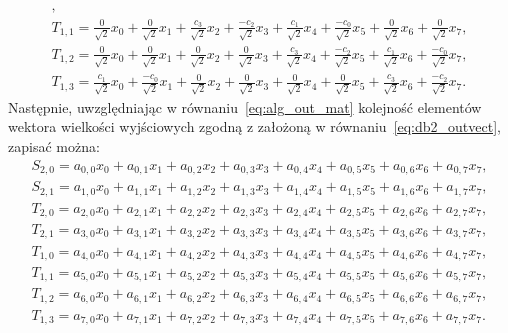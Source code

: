 \begin{gather}
\label{eq:db2_outvect_t_1_0_full}, \\
T_{1,1} =
	\frac{0}{\sqrt{2}} x_{0} + \frac{0}{\sqrt{2}} x_{1} + \frac{c_{3}}{\sqrt{2}} x_{2} + \frac{- c_{2}}{\sqrt{2}} x_{3} +
	\frac{c_{1}}{\sqrt{2}} x_{4} + \frac{- c_{0}}{\sqrt{2}} x_{5} + \frac{0}{\sqrt{2}} x_{6} + \frac{0}{\sqrt{2}} x_{7}
\label{eq:db2_outvect_t_1_1_full}, \\
T_{1,2} =
	\frac{0}{\sqrt{2}} x_{0} + \frac{0}{\sqrt{2}} x_{1} + \frac{0}{\sqrt{2}} x_{2} + \frac{0}{\sqrt{2}} x_{3} +
	\frac{c_{3}}{\sqrt{2}} x_{4} + \frac{- c_{2}}{\sqrt{2}} x_{5} + \frac{c_{1}}{\sqrt{2}} x_{6} + \frac{- c_{0}}{\sqrt{2}} x_{7}
\label{eq:db2_outvect_t_1_2_full}, \\
T_{1,3} =
	\frac{c_{1}}{\sqrt{2}} x_{0} + \frac{- c_{0}}{\sqrt{2}} x_{1} + \frac{0}{\sqrt{2}} x_{2} + \frac{0}{\sqrt{2}} x_{3} +
	\frac{0}{\sqrt{2}} x_{4} + \frac{0}{\sqrt{2}} x_{5} + \frac{c_{3}}{\sqrt{2}} x_{6} + \frac{- c_{2}}{\sqrt{2}} x_{7}
\label{eq:db2_outvect_t_1_3_full}.
\end{gather}
Następnie, uwzględniając w równaniu~\eqref{eq:alg_out_mat} kolejność elementów wektora wielkości wyjściowych zgodną z założoną w równaniu~\eqref{eq:db2_outvect}, zapisać można:
\begin{gather}
S_{2,0} = a_{0,0} x_{0} + a_{0,1} x_{1} + a_{0,2} x_{2} + a_{0,3} x_{3} + a_{0,4} x_{4} + a_{0,5} x_{5} + a_{0,6} x_{6} + a_{0,7} x_{7} \label{eq:db2_outvect_s_2_0_row}, \\
S_{2,1} = a_{1,0} x_{0} + a_{1,1} x_{1} + a_{1,2} x_{2} + a_{1,3} x_{3} + a_{1,4} x_{4} + a_{1,5} x_{5} + a_{1,6} x_{6} + a_{1,7} x_{7} \label{eq:db2_outvect_s_2_1_row}, \\
T_{2,0} = a_{2,0} x_{0} + a_{2,1} x_{1} + a_{2,2} x_{2} + a_{2,3} x_{3} + a_{2,4} x_{4} + a_{2,5} x_{5} + a_{2,6} x_{6} + a_{2,7} x_{7} \label{eq:db2_outvect_t_2_0_row}, \\
T_{2,1} = a_{3,0} x_{0} + a_{3,1} x_{1} + a_{3,2} x_{2} + a_{3,3} x_{3} + a_{3,4} x_{4} + a_{3,5} x_{5} + a_{3,6} x_{6} + a_{3,7} x_{7} \label{eq:db2_outvect_t_2_1_row}, \\
T_{1,0} = a_{4,0} x_{0} + a_{4,1} x_{1} + a_{4,2} x_{2} + a_{4,3} x_{3} + a_{4,4} x_{4} + a_{4,5} x_{5} + a_{4,6} x_{6} + a_{4,7} x_{7} \label{eq:db2_outvect_t_1_0_row}, \\
T_{1,1} = a_{5,0} x_{0} + a_{5,1} x_{1} + a_{5,2} x_{2} + a_{5,3} x_{3} + a_{5,4} x_{4} + a_{5,5} x_{5} + a_{5,6} x_{6} + a_{5,7} x_{7} \label{eq:db2_outvect_t_1_1_row}, \\
T_{1,2} = a_{6,0} x_{0} + a_{6,1} x_{1} + a_{6,2} x_{2} + a_{6,3} x_{3} + a_{6,4} x_{4} + a_{6,5} x_{5} + a_{6,6} x_{6} + a_{6,7} x_{7} \label{eq:db2_outvect_t_1_2_row}, \\
T_{1,3} = a_{7,0} x_{0} + a_{7,1} x_{1} + a_{7,2} x_{2} + a_{7,3} x_{3} + a_{7,4} x_{4} + a_{7,5} x_{5} + a_{7,6} x_{6} + a_{7,7} x_{7} \label{eq:db2_outvect_t_1_3_row}.
\end{gather}

